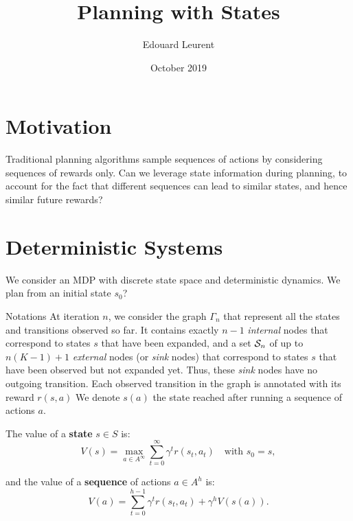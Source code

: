 \documentclass{article}
\title{Planning with States}
\author{Edouard Leurent}
\date{October 2019}
\begin{document}
\maketitle

\tableofcontents

\section{Motivation}

Traditional planning algorithms sample sequences of actions by considering sequences of rewards only. Can we leverage state information during planning, to account for the fact that different sequences can lead to similar states, and hence similar future rewards?

\section{Deterministic Systems}

We consider an MDP with discrete state space and deterministic dynamics. We plan from an initial state $s_0$?
\begin{paragraph}{Notations}
At iteration $n$, we consider the graph $\Gamma_n$ that represent all the states and transitions observed so far. It contains exactly $n-1$ \emph{internal} nodes that correspond to states $s$ that have been expanded, and a set $\mathcal{S}_n$ of up to $n(K-1)+1$ \emph{external} nodes (or \emph{sink} nodes) that correspond to states $s$ that have been observed but not expanded yet. Thus, these \emph{sink} nodes have no outgoing transition. Each observed transition in the graph is annotated with its reward $r(s,a)$
We denote $s(a)$ the state reached after running a sequence of actions $a$.
\end{paragraph}

\begin{definition}[Values]
The value of a \textbf{state} $s\in S$ is:
\begin{equation}
    V(s) = \max_{a\in A^\infty} \sum_{t=0}^\infty \gamma^t r(s_t, a_t) \quad \text{with $s_0=s$},
\end{equation}



and the value of a \textbf{sequence} of actions $a\in A^h$ is:
\begin{equation}
\label{eq:state_value}
    V(a) = \sum_{t=0}^{h-1}\gamma^t r(s_t, a_t) + \gamma^{h} V(s(a)).
\end{equation}
\end{definition}
\end{document}
